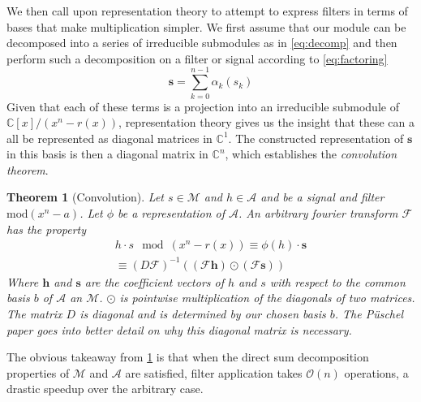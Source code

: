 \documentclass[12pt,technote]{IEEEtran}
\newtheorem{theorem}{Theorem}[section]
\begin{document}
We then call upon representation theory to attempt to express filters in terms of bases that make multiplication simpler. We first assume that our module can be decomposed into a series of irreducible submodules as in \eqref{eq:decomp} and then perform such a decomposition on a filter or signal according to \eqref{eq:factoring}
\begin{equation*}
    \mathbf{s} = \sum_{k=0}^{n-1}\alpha_k(s_k)
\end{equation*}
Given that each of these terms is a projection into an irreducible submodule of $\mathbb{C}[x]/(x^n-r(x))$, representation theory gives us the insight that these can a all be represented as diagonal matrices in $\mathbb{C}^1$. The constructed representation of $\mathbf{s}$ in this basis is then a diagonal matrix in $\mathbb{C}^n$, which establishes the \textit{convolution theorem}.
\begin{theorem}[Convolution]
    \label{thm:convolution}
    Let $s\in \mathcal{M}$ and $h\in \mathcal{A}$ and be a signal and filter $\text{mod} (x^n-a)$. Let $\phi$ be a representation of $\mathcal{A}$. An arbitrary fourier transform $\mathcal{F}$ has the property
    \begin{align*}
        h\cdot s\mod{(x^n-r(x))} \equiv \phi(h) \cdot \mathbf{s}\\
        \equiv (D\mathcal{F})^{-1}((\mathcal{F}\mathbf{h}) \odot (\mathcal{F}\mathbf{s}))
    \end{align*} 
    Where $\mathbf{h}$ and $\mathbf{s}$ are the coefficient vectors of $h$ and $s$ with respect to the common basis $b$ of $\mathcal{A}$ an $\mathcal{M}$. $\odot$ is pointwise multiplication of the diagonals of two matrices. The matrix $D$ is diagonal and is determined by our chosen basis $b$. The P\"uschel paper goes into better detail on why this diagonal matrix is necessary. 
\end{theorem}
The obvious takeaway from \ref{thm:convolution} is that when the direct sum decomposition properties of $\mathcal{M}$ and $\mathcal{A}$ are satisfied, filter application takes $\mathcal{O}(n)$ operations, a drastic speedup over the arbitrary case.
\end{document}
